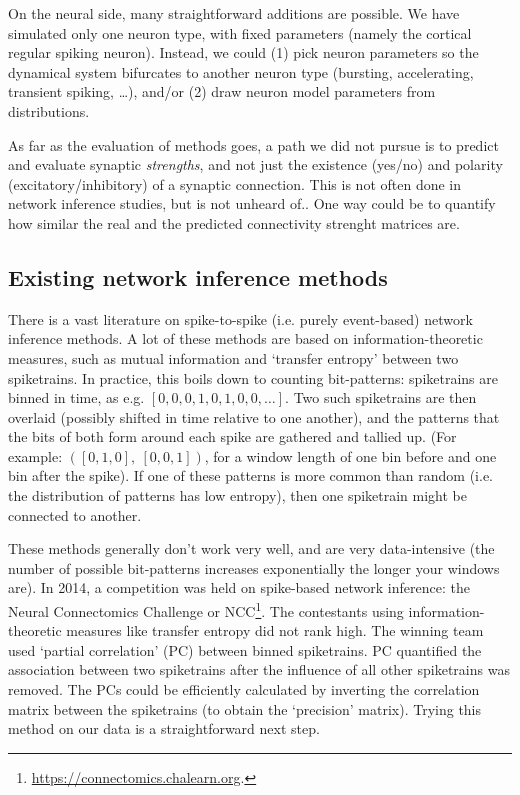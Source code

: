 On the neural side, many straightforward additions are possible. We have simulated only one neuron type, with fixed parameters (namely the cortical regular spiking neuron). Instead, we could (1) pick neuron parameters so the dynamical system bifurcates to another neuron type (bursting, accelerating, transient spiking, …)\cite{Naud2008FiringPatternsAdaptive}, and/or (2) draw neuron model parameters from distributions.

As far as the evaluation of methods goes, a path we did not pursue is to predict and evaluate synaptic \emph{strengths}, and not just the existence (yes/no) and polarity (excitatory/inhibitory) of a synaptic connection. This is not often done in network inference studies, but is not unheard of.\cite{Zhang2017SpikeTriggeredRegressionSynaptic}.
One way could be to quantify how similar the real and the predicted connectivity strenght matrices are.


\subsection{Existing network inference methods}

There is a vast literature on spike-to-spike (i.e. purely event-based) network inference methods. A lot of these methods are based on information-theoretic measures, such as mutual information and `transfer entropy' between two spiketrains. In practice, this boils down to counting bit-patterns: spiketrains are binned in time, as e.g. $[0, 0, 0, 1, 0, 1, 0, 0, …]$. Two such spiketrains are then overlaid (possibly shifted in time relative to one another), and the patterns that the bits of both form around each spike are gathered and tallied up. (For example: $([0,1,0],\ [0,0,1])$, for a window length of one bin before and one bin after the spike). If one of these patterns is more common than random (i.e. the distribution of patterns has low entropy), then one spiketrain might be connected to another.

These methods generally don't work very well\cite{Das2020SystematicErrorsConnectivity}, and are very data-intensive (the number of possible bit-patterns increases exponentially the longer your windows are). In 2014, a competition was held on spike-based network inference: the Neural Connectomics Challenge or NCC\cite{Guyon2014DesignFirstNeuronal,Orlandi2017FirstConnectomicsChallenge}\footnote{
    \url{https://connectomics.chalearn.org}.
}.
The contestants using information-theoretic measures like transfer entropy did not rank high.
The winning team used `partial correlation' (PC) between binned spiketrains.\cite{Sutera2017SimpleConnectomeInference}
PC quantified the association between two spiketrains after the influence of all other spiketrains was removed. The PCs could be efficiently calculated by inverting the correlation matrix between the spiketrains (to obtain the `precision' matrix).
Trying this method on our data is a straightforward next step.


